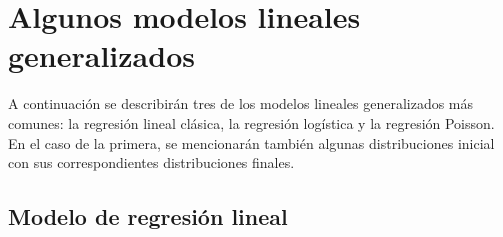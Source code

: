 





\section{Algunos modelos lineales generalizados}


A continuación se describirán tres de los modelos lineales generalizados más comunes: la regresión lineal clásica, la regresión logística y la regresión Poisson. En el caso de la primera, se mencionarán también algunas distribuciones inicial con sus correspondientes distribuciones finales.


\subsection{Modelo de regresión lineal}


